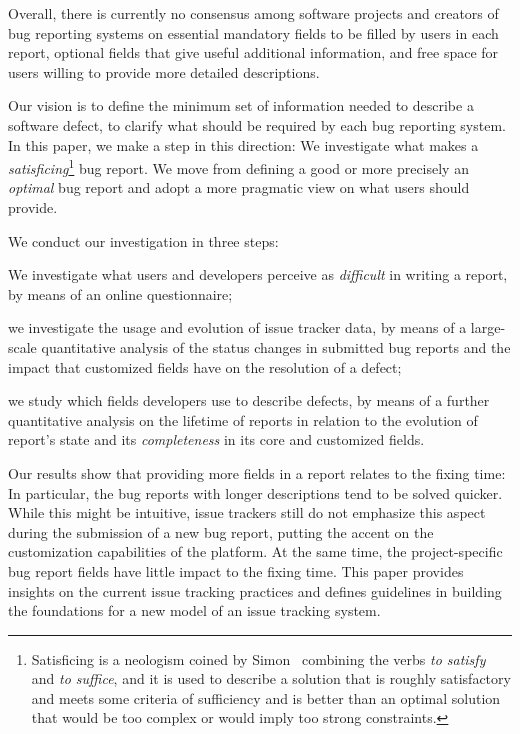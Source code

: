 Overall, there is currently no consensus among software projects and creators of bug reporting systems on essential mandatory fields to be filled by users in each report, optional fields that give useful additional information, and free space for users willing to provide more detailed descriptions.

Our vision is to define the minimum set of information needed to describe a software defect, to clarify what should be required by each bug reporting system.
In this paper, we make a step in this direction: We investigate what makes a \emph{satisficing}\footnote{Satisficing is a neologism coined by Simon~\cite{Simo57,Simo01} combining the verbs {\em to satisfy} and {\em to suffice}, and it is used to describe a solution that is roughly satisfactory and meets some criteria of sufficiency and is better than an optimal solution that would be too complex or would imply too strong constraints.} bug report.
We move from defining a good or more precisely an \emph{optimal} bug report and adopt a more pragmatic view on what users should provide.


We conduct our investigation in three steps: \begin{inparaenum}[(1)]
\item We investigate what users and developers perceive as \emph{difficult} in writing a report, by means of an online questionnaire;
\item we investigate the usage and evolution of issue tracker data, by means of a large-scale quantitative analysis of the status changes in submitted bug reports and the impact that customized fields have on the resolution of a defect;
\item we study which fields developers use to describe defects, by means of a further quantitative analysis on the lifetime of reports in relation to the evolution of report's state and its \emph{completeness} in its core and customized fields.
\end{inparaenum}

Our results show that providing more fields in a report relates to the fixing time: In particular, the bug reports with longer descriptions tend to be solved quicker.
While this might be intuitive, issue trackers still do not emphasize this aspect during the submission of a new bug report, putting the accent on the customization capabilities of the platform.
At the same time, the project-specific bug report fields have little impact to the fixing time.
This paper provides insights on the current issue tracking practices and defines guidelines in building the foundations for a new model of an issue tracking system.

